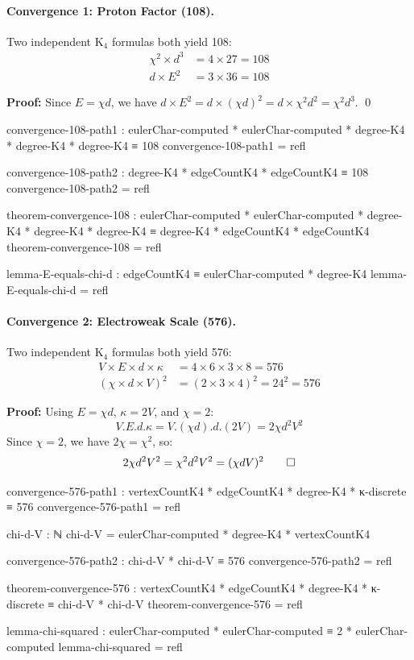 \documentclass[11pt,a4paper]{book}
\def\cdot{.}%
\begin{document}
\paragraph{Convergence 1: Proton Factor (108).}

Two independent K$_4$ formulas both yield 108:
\begin{align}
\chi^2 \times d^3 &= 4 \times 27 = 108 \\
d \times E^2 &= 3 \times 36 = 108
\end{align}

\textbf{Proof:} Since $E = \chi d$, we have $d \times E^2 = d \times (\chi d)^2 = d \times \chi^2 d^2 = \chi^2 d^3$. \qed

\begin{code}
convergence-108-path1 : eulerChar-computed * eulerChar-computed * degree-K4 * degree-K4 * degree-K4 ≡ 108
convergence-108-path1 = refl

convergence-108-path2 : degree-K4 * edgeCountK4 * edgeCountK4 ≡ 108
convergence-108-path2 = refl

theorem-convergence-108 : eulerChar-computed * eulerChar-computed * degree-K4 * degree-K4 * degree-K4 
                        ≡ degree-K4 * edgeCountK4 * edgeCountK4
theorem-convergence-108 = refl

lemma-E-equals-chi-d : edgeCountK4 ≡ eulerChar-computed * degree-K4
lemma-E-equals-chi-d = refl
\end{code}

\paragraph{Convergence 2: Electroweak Scale (576).}

Two independent K$_4$ formulas both yield 576:
\begin{align}
V \times E \times d \times \kappa &= 4 \times 6 \times 3 \times 8 = 576 \\
(\chi \times d \times V)^2 &= (2 \times 3 \times 4)^2 = 24^2 = 576
\end{align}

\textbf{Proof:} Using $E = \chi d$, $\kappa = 2V$, and $\chi = 2$:
\[
V \cdot E \cdot d \cdot \kappa = V \cdot (\chi d) \cdot d \cdot (2V) = 2\chi d^2 V^2
\]
Since $\chi = 2$, we have $2\chi = \chi^2$, so:
\[
2\chi d^2 V^2 = \chi^2 d^2 V^2 = (\chi d V)^2 \qed
\]

\begin{code}
convergence-576-path1 : vertexCountK4 * edgeCountK4 * degree-K4 * κ-discrete ≡ 576
convergence-576-path1 = refl

chi-d-V : ℕ
chi-d-V = eulerChar-computed * degree-K4 * vertexCountK4

convergence-576-path2 : chi-d-V * chi-d-V ≡ 576
convergence-576-path2 = refl

theorem-convergence-576 : vertexCountK4 * edgeCountK4 * degree-K4 * κ-discrete 
                        ≡ chi-d-V * chi-d-V
theorem-convergence-576 = refl

lemma-chi-squared : eulerChar-computed * eulerChar-computed ≡ 2 * eulerChar-computed
lemma-chi-squared = refl
\end{code}
\end{document}
